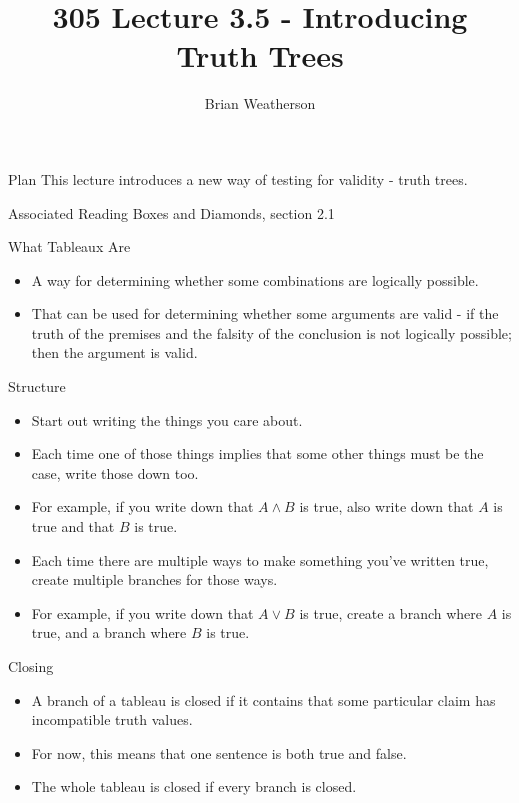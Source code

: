 \documentclass[
  ignorenonframetext,
]{beamer}
\title{305 Lecture 3.5 - Introducing Truth Trees}
\author{Brian Weatherson}
\date{}
\providecommand{\tightlist}{%
  \setlength{\itemsep}{0pt}\setlength{\parskip}{0pt}}
\renewcommand{\,}{\text{, }}
\begin{document}
\frame{\titlepage}

\begin{frame}{Plan}
\protect\hypertarget{plan}{}
This lecture introduces a new way of testing for validity - truth trees.
\end{frame}

\begin{frame}{Associated Reading}
\protect\hypertarget{associated-reading}{}
Boxes and Diamonds, section 2.1
\end{frame}

\begin{frame}{What Tableaux Are}
\protect\hypertarget{what-tableaux-are}{}
\begin{itemize}
\tightlist
\item
  A way for determining whether some combinations are logically
  possible.
\item
  That can be used for determining whether some arguments are valid - if
  the truth of the premises and the falsity of the conclusion is not
  logically possible; then the argument is valid.
\end{itemize}
\end{frame}

\begin{frame}{Structure}
\protect\hypertarget{structure}{}
\begin{itemize}
\tightlist
\item
  Start out writing the things you care about.\pause
\item
  Each time one of those things implies that some other things must be
  the case, write those down too.
\item
  For example, if you write down that \(A \wedge B\) is true, also write
  down that \(A\) is true and that \(B\) is true. \pause
\item
  Each time there are multiple ways to make something you've written
  true, create multiple branches for those ways.
\item
  For example, if you write down that \(A \vee B\) is true, create a
  branch where \(A\) is true, and a branch where \(B\) is true.
\end{itemize}
\end{frame}

\begin{frame}{Closing}
\protect\hypertarget{closing}{}
\begin{itemize}
\tightlist
\item
  A branch of a tableau is closed if it contains that some particular
  claim has incompatible truth values.
\item
  For now, this means that one sentence is both true and false.\pause
\item
  The whole tableau is closed if every branch is closed.
\end{itemize}
\end{frame}
\end{document}
